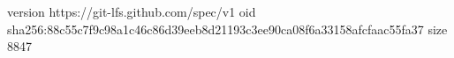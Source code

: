 version https://git-lfs.github.com/spec/v1
oid sha256:88c55c7f9c98a1c46c86d39eeb8d21193c3ee90ca08f6a33158afcfaac55fa37
size 8847
